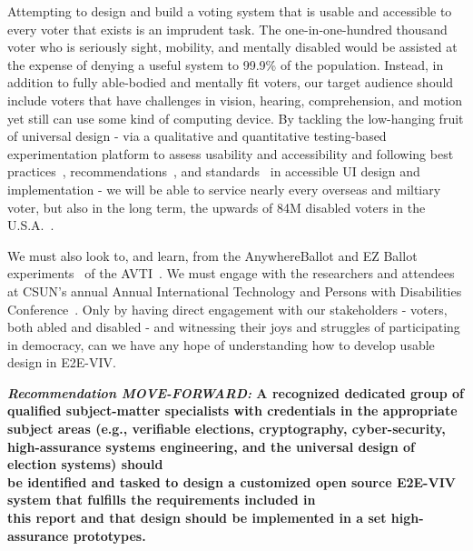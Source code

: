 Attempting to design and build a voting system that is usable and
accessible to every voter that exists is an imprudent task. The
one-in-one-hundred thousand voter who is seriously sight, mobility, and
mentally disabled would be assisted at the expense of 
denying a useful system to 99.9\% of the population. 
Instead, in addition to fully able-bodied and mentally fit voters, our
target audience should include voters that have challenges in vision,
hearing, comprehension, and motion yet still can use some kind of
computing device. By tackling the low-hanging fruit of universal
design - via a qualitative and quantitative testing-based
experimentation platform to assess usability and accessibility and
following best practices~\cite{materials-at-elections.itif.org},
recommendations~\cite{WAI,Section508,WAVE}, and
standards~\cite{standards} in accessible UI design and implementation
- we will be able to service nearly every overseas and miltiary voter,
but also in the long term, the upwards of 84M disabled voters in the
U.S.A.~\cite{Brennen,CensusData}.

We must also look to, and learn, from the AnywhereBallot and
EZ Ballot experiments~\cite{AnywhereBallot,EZBallot} of the
AVTI~\cite{AVTI}.  We must engage with the researchers and attendees
at CSUN's annual Annual International Technology and Persons with
Disabilities Conference~\cite{CSUN}. Only by having direct engagement
with our stakeholders - voters, both abled and disabled - and
witnessing their joys and struggles of participating in democracy, can
we have any hope of understanding how to develop usable design in
E2E-VIV.

\begin{center}
  \textbf{\emph{Recommendation MOVE-FORWARD:} A recognized dedicated
    group of qualified subject-matter specialists with credentials in
    the appropriate subject areas (e.g., verifiable elections,
    cryptography, cyber-security, high-assurance systems engineering,
    and the universal design of election systems) should\\
    be identified and tasked to design a customized open source
    E2E-VIV system that fulfills the
    requirements included in\\
    this report and that design should be implemented in a set
    high-assurance prototypes.}
\end{center}

